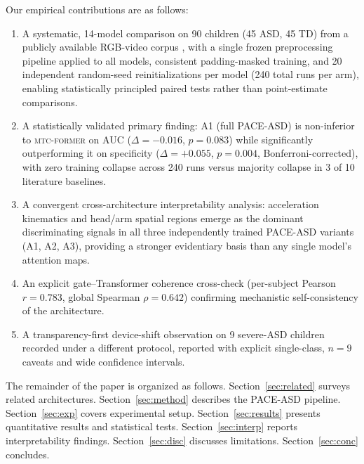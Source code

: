 \documentclass[a4paper,fleqn]{cas-sc}
\newcommand{\mtcf}{\textsc{mtc-former}\xspace}
\begin{document}
Our empirical contributions are as follows:
\begin{enumerate}
  \item A systematic, 14-model comparison on 90 children (45 ASD, 45 TD) from a publicly
        available RGB-video corpus \citep{aljubouri2020}, with a single frozen
        preprocessing pipeline applied to all models, consistent
        padding-masked training, and 20 independent random-seed reinitializations
        per model (240 total runs per arm), enabling statistically principled
        paired tests rather than point-estimate comparisons.

  \item A statistically validated primary finding: A1 (full PACE-ASD) is
        non-inferior to \mtcf on AUC ($\Delta = -0.016$, $p = 0.083$) while
        significantly outperforming it on specificity ($\Delta = +0.055$,
        $p = 0.004$, Bonferroni-corrected), with zero training collapse across
        240 runs versus majority collapse in 3 of 10 literature baselines.

  \item A convergent cross-architecture interpretability analysis: acceleration
        kinematics and head/arm spatial regions emerge as the dominant
        discriminating signals in all three independently trained PACE-ASD
        variants (A1, A2, A3), providing a stronger evidentiary basis than
        any single model's attention maps.

  \item An explicit gate--Transformer coherence cross-check
        (per-subject Pearson $r = 0.783$, global Spearman $\rho = 0.642$)
        confirming mechanistic self-consistency of the architecture.

  \item A transparency-first device-shift observation on 9 severe-ASD children
        recorded under a different protocol, reported with explicit single-class,
        $n=9$ caveats and wide confidence intervals.
\end{enumerate}

The remainder of the paper is organized as follows.
Section~\ref{sec:related} surveys related architectures.
Section~\ref{sec:method} describes the PACE-ASD pipeline.
Section~\ref{sec:exp} covers experimental setup.
Section~\ref{sec:results} presents quantitative results and statistical tests.
Section~\ref{sec:interp} reports interpretability findings.
Section~\ref{sec:disc} discusses limitations.
Section~\ref{sec:conc} concludes.
\end{document}
